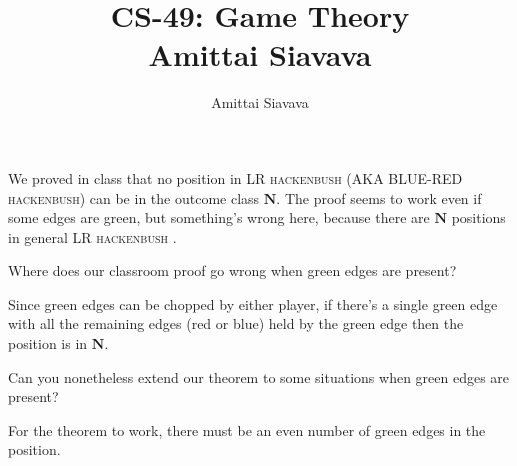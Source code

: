 \documentclass[11pt, reqno]{amsart}
\begin{document}

\title{CS-49: Game Theory\\ Amittai Siavava \\ }
\author{Amittai Siavava}


\setlength{\headheight}{13.0pt}
\setlength{\footskip}{15.0pt}

\maketitle

\bigskip

\def \cram { \textsc{cram} }
\def \dom { \textsc{domineering} }
\def \sub { \textsc{subtraction} }
\def \weighted { \textsc{weighted odds and evens}}
\def \nim { \textsc{nim} }
\def \P { \mathbf{P}}
\def \N { \mathbf{N}}
\def \cc { \mathbf{cc} }
\def \hackenbush { \textsc{LR hackenbush} }

\newpage
\begin{problem}[19]
  We proved in class that no position in \hackenbush
  (AKA \textsc{BLUE-RED hackenbush}) can be in the outcome class $\N$.
  The proof seems to work even if some edges are green,
  but something's wrong here, because there are $\N$ positions in general
  \hackenbush.
  
  \begin{enumarabic}
    \item Where does our classroom proof go wrong when green edges are present?
    
      \step
      Since green edges can be chopped by either player,
      if there's a single green edge with all the remaining
      edges (red or blue) held by the green edge then the position is in $\N$.
    \item Can you nonetheless extend our theorem to some situations when
      green edges are present?

      \step
      For the theorem to work, there must be an even number of green edges
      in the position.
  \end{enumarabic}
\end{problem}
\end{document}
